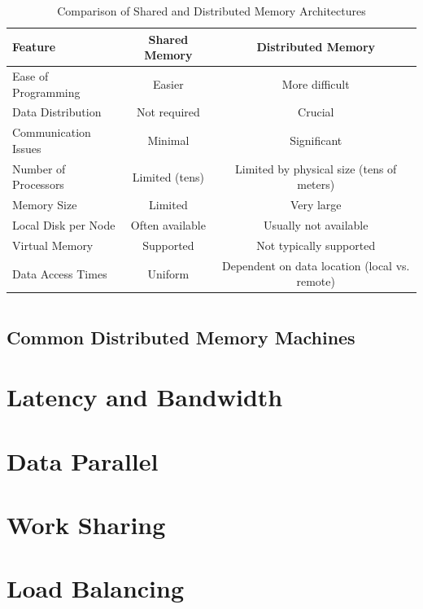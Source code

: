 \documentclass[12pt, a4paper]{book}
\begin{document}
\begin{table}[h!]
    \centering
    \caption{Comparison of Shared and Distributed Memory Architectures}
    \label{tab:shared_distributed}
    \begin{tabular}{|l|c|c|}
        \hline
        \textbf{Feature}     & \textbf{Shared Memory} & \textbf{Distributed Memory}                   \\ \hline
        Ease of Programming  & Easier                 & More difficult                                \\ \hline
        Data Distribution    & Not required           & Crucial                                       \\ \hline
        Communication Issues & Minimal                & Significant                                   \\ \hline
        Number of Processors & Limited (tens)         & Limited by physical size (tens of meters)     \\ \hline
        Memory Size          & Limited                & Very large                                    \\ \hline
        Local Disk per Node  & Often available        & Usually not available                         \\ \hline
        Virtual Memory       & Supported              & Not typically supported                       \\ \hline
        Data Access Times    & Uniform                & Dependent on data location (local vs. remote) \\ \hline
    \end{tabular}
\end{table}

\section{}
\subsection{Common Distributed Memory Machines}
\section{Latency and Bandwidth}
\section{Data Parallel}
\section{Work Sharing}
\section{Load Balancing}


\end{document}
